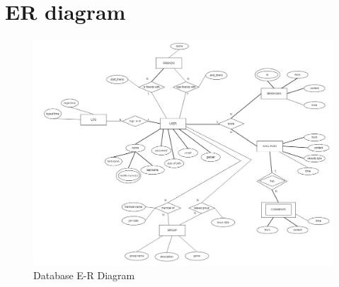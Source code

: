 \clearpage

\section{ER diagram}

\begin{figure}[h]
    \centering
    \includegraphics[width=\textwidth]{images/design/er_diagram.jpg}
    \caption{Database E-R Diagram}
    \label{fig:db_er_diag}
\end{figure}
